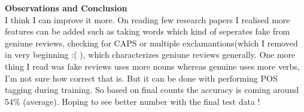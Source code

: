 \documentclass[addpoints,12pt]{exam}
\begin{document}
\textbf{Observations and Conclusion}\\
I think I can improve it more. On reading few research papers I realised more features can be added such as taking words which kind of seperates fake from geniune reviews, checking for CAPS or multiple exclamantions(which I removed in very beginning :( ), which characterizes geniune reviews generally. One more thing I read was fake reviews uses more nouns whereas genuine uses more verbs, I'm not sure how correct that is. But it can be done with performing POS tagging during training.
So based on final counts the accuracy is coming around 54\% (average).
Hoping to see better number with the final test data !
\end{document}
